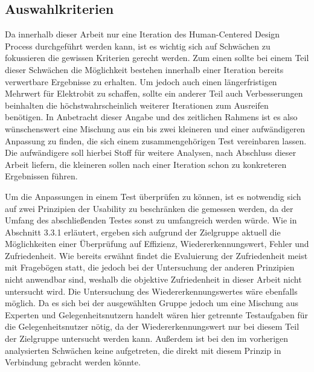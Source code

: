 \subsection{Auswahlkriterien}
Da innerhalb dieser Arbeit nur eine Iteration des Human-Centered Design Process durchgeführt werden kann, ist es wichtig sich auf Schwächen zu fokussieren die gewissen Kriterien gerecht werden.
Zum einen sollte bei einem Teil dieser Schwächen die Möglichkeit bestehen innerhalb einer Iteration bereits verwertbare Ergebnisse zu erhalten.
Um jedoch auch einen längerfristigen Mehrwert für Elektrobit zu schaffen, sollte ein anderer Teil auch Verbesserungen beinhalten die höchstwahrscheinlich weiterer Iterationen zum Ausreifen benötigen.
In Anbetracht dieser Angabe und des zeitlichen Rahmens ist es also wünschenswert eine Mischung aus ein bis zwei kleineren und einer aufwändigeren Anpassung zu finden, die sich einem zusammengehörigen Test vereinbaren lassen.
Die aufwändigere soll hierbei Stoff für weitere Analysen, nach Abschluss dieser Arbeit liefern, die kleineren sollen nach einer Iteration schon zu konkreteren Ergebnissen führen.

Um die Anpassungen in einem Test überprüfen zu können, ist es notwendig sich auf zwei Prinzipien der Usability zu beschränken die gemessen werden, da der Umfang des abschließenden Testes sonst zu umfangreich werden würde. Wie in Abschnitt 3.3.1 erläutert, ergeben sich aufgrund der Zielgruppe aktuell die Möglichkeiten einer Überprüfung auf Effizienz, Wiedererkennungswert, Fehler und Zufriedenheit.
Wie bereits erwähnt findet die Evaluierung der Zufriedenheit meist mit Fragebögen statt, die jedoch bei der Untersuchung der anderen Prinzipien nicht anwendbar sind, weshalb die objektive Zufriedenheit in dieser Arbeit nicht untersucht wird.
Die Untersuchung des Wiedererkennungswertes wäre ebenfalls möglich.
Da es sich bei der ausgewählten Gruppe jedoch um eine Mischung aus Experten und Gelegenheitsnutzern handelt wären hier getrennte Testaufgaben für die Gelegenheitsnutzer nötig, da der Wiedererkennungswert nur bei diesem Teil der Zielgruppe untersucht werden kann.
Außerdem ist bei den im vorherigen analysierten Schwächen keine aufgetreten, die direkt mit diesem Prinzip in Verbindung gebracht werden könnte.


